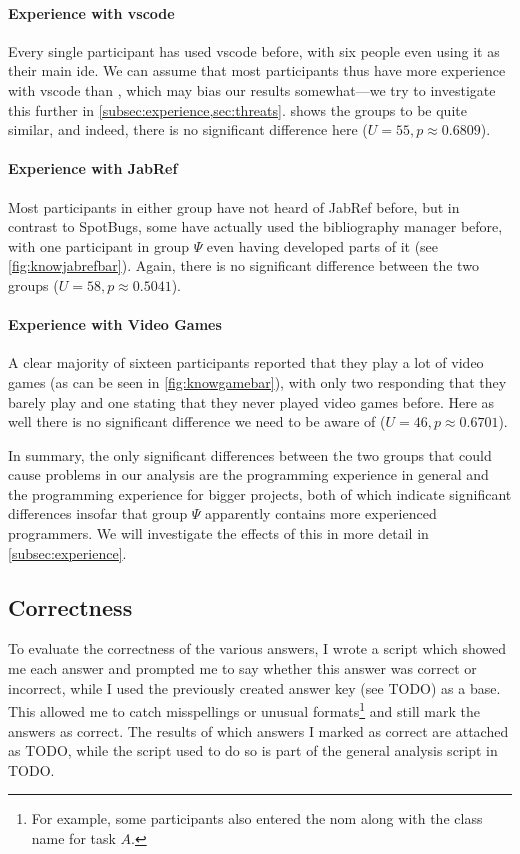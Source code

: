 \documentclass[../thesis]{subfiles}
\begin{document}
\paragraph{Experience with \gls{vscode}}
Every single participant has used \gls{vscode} before, with six people even using it as their main \gls{ide}.
We can assume that most participants thus have more experience with \gls{vscode} than \SEE{}, which may bias our results somewhat---we try to investigate this further in \cref{subsec:experience,sec:threats}.
 shows the groups to be quite similar, and indeed, there is no significant difference here ($U = 55, p \approx 0.6809$).

\paragraph{Experience with JabRef}
Most participants in either group have not heard of JabRef before, but in contrast to SpotBugs, some have actually used the bibliography manager before, with one participant in group $\Psi$ even having developed parts of it (see \cref{fig:knowjabrefbar}).
Again, there is no significant difference between the two groups ($U = 58, p \approx 0.5041$).

\paragraph{Experience with Video Games}
A clear majority of sixteen participants reported that they play a lot of video games (as can be seen in \cref{fig:knowgamebar}), with only two responding that they barely play and one stating that they never played video games before.
Here as well there is no significant difference we need to be aware of ($U = 46, p \approx 0.6701$).

In summary, the only significant differences between the two groups that could cause problems in our analysis are the programming experience in general and the programming experience for bigger projects, both of which indicate significant differences insofar that group $\Psi$ apparently contains more experienced programmers.
We will investigate the effects of this in more detail in \cref{subsec:experience}.

\subsection{Correctness}\label{subsec:correct}
To evaluate the correctness of the various answers, I wrote a script which showed me each answer and prompted me to say whether this answer was correct or incorrect, while I used the previously created answer key (see {TODO}) as a base.
This allowed me to catch misspellings or unusual formats\footnote{For example, some participants also entered the \gls{nom} along with the class name for task $A$.} and still mark the answers as correct.
The results of which answers I marked as correct are attached as {TODO}, while the script used to do so is part of the general analysis script in {TODO}.
\end{document}
